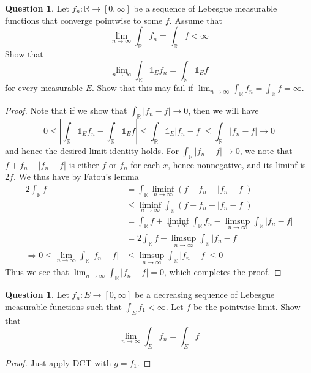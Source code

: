 \documentclass{article}
\newcommand{\longimplies}{\Longrightarrow}
\newcommand{\R}{\mathbb{R}}
\theoremstyle{definition} %
\numberwithin{thm}{section} %
\theoremstyle{definition} %
\newtheorem{question}[thm]{Question}
\begin{document}
\begin{question}
Let $f_n : \mathbb{R} \to [0, \infty]$ be a sequence of Lebesgue measurable functions that converge pointwise to some $f$. Assume that
\[
\lim_{n \to \infty} \int_{\mathbb{R}} f_n = \int_{\mathbb{R}} f < \infty
\]
Show that
\[
\lim_{n \to \infty} \int_{\mathbb{R}} \mathds{1}_E f_n = \int_{\mathbb{R}} \mathds{1}_E f
\]
for every measurable $E$. Show that this may fail if $\lim_{n \to \infty} \int_{\mathbb{R}} f_n = \int_{\mathbb{R}} f = \infty$.
\end{question}
\begin{proof}
Note that if we show that $\int_\R |f_n - f| \to 0$, then we will have 
\[ 0 \leq \left|\int_\R \mathds{1}_E f_n - \int_\R \mathds{1}_E f\right| \leq \int_\R \mathds{1}_E \left|f_n - f\right| \leq \int_\R \left|f_n - f\right| \to 0 \]
and hence the desired limit identity holds. For $\int_\R |f_n - f| \to 0$, we note that $f + f_n - |f_n - f|$ is either $f$ or $f_n$ for each $x$, hence nonnegative, and its liminf is $2f$. We thus have by Fatou's lemma
\begin{align*}
    2\int_\R f 
    &= \int_\R \liminf_{n \to \infty} (f + f_n - |f_n - f|) \\
    &\leq \liminf_{n \to \infty} \int_\R (f + f_n - |f_n - f|) \\
    &= \int_\R f + \liminf_{n \to \infty} \int_\R f_n - \limsup_{n \to \infty} \int_\R |f_n - f| \\
    &= 2\int_\R f - \limsup_{n \to \infty} \int_\R |f_n - f| \\
    \longimplies 0 \leq \lim_{n \to \infty} \int_\R |f_n - f| &\leq \limsup_{n \to \infty} \int_\R |f_n - f| \leq 0
\end{align*}
Thus we see that $\lim_{n \to \infty} \int_\R |f_n - f| = 0$, which completes the proof.
\end{proof}

\begin{question}
Let $f_n : E \to [0, \infty]$ be a decreasing sequence of Lebesgue measurable functions such that $\int_E f_1 < \infty$. Let $f$ be the pointwise limit. Show that
\[
\lim_{n \to \infty} \int_E f_n = \int_E f
\]
\end{question}
\begin{proof}
Just apply DCT with $g = f_1$.
\end{proof}
\end{document}
